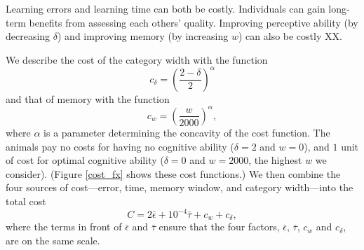 Learning errors and learning time can both be costly. Individuals can gain long-term benefits from assessing each others' quality. 
Improving  perceptive ability (by decreasing $\delta$) and improving memory (by increasing $w$) can also be costly XX. %

We describe the cost of the category width with the function
\begin{equation*}
c_\delta = \left(\frac{2-\delta}{2}\right)^\alpha
\end{equation*}
and that of memory with the function
\begin{equation*}
c_w = \left(\frac{w}{2000}\right)^\alpha,
\end{equation*}
where $\alpha$ is a parameter determining the concavity of the cost function. The animals pay no costs for having no cognitive ability ($\delta=2$ and $w=0$), and $1$ unit of cost for optimal cognitive ability ($\delta=0$ and $w=2000$, the highest $w$ we consider). (Figure \ref{cost_fx} shows these cost functions.)
We then combine the four sources of cost---error, time, memory window, and category width---into the total cost 
\begin{equation*}
C = 2\bar{\epsilon}+10^{-4}\bar{\tau}+c_w+c_\delta,
\end{equation*}
where the terms in front of $\bar{\epsilon}$ and $\bar{\tau}$ ensure that the four factors, $\bar{\epsilon}$, $\bar{\tau}$, $c_w$ and $c_\delta$, are on the same scale. 

